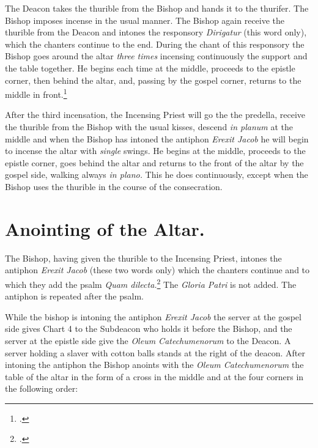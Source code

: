 \documentclass[letterpaper]{report}
\begin{document}
{\rubric The Deacon takes the thurible from the Bishop and hands it to the
thurifer. The Bishop imposes incense in the usual manner. The Bishop again
receive the thurible from the Deacon and intones the responsory
\textit{Dirigatur} (this word only), which the chanters continue to the end.
During the chant of this responsory the Bishop goes around the altar
\textit{three times} incensing continuously the support and the table together.
He begins each time at the middle, proceeds to the epistle corner, then behind
the altar, and, passing by the gospel corner, returns to the middle in
front.\footcite[If the back of the altar is attached to the wall, he begins at
the middle, incenses the support as fas as the epistle corner, afterwards the
table from the epistle to the gospel side, then the side of the altar at the
gospel side, then the side of the altar at the gospel corner and finally the
support from the gospel corner to the middle.][footnote 1, p. 96.]{consecranda}

\rubric After the third incensation, the Incensing Priest will go the the
predella, receive the thurible from the Bishop with the usual kisses, descend
\textit{in planum} at the middle and when the Bishop has intoned the antiphon
\textit{Erexit Jacob} he will begin to incense the altar with \textit{single}
swings. He begins at the middle, proceeds to the epistle corner, goes behind
the altar and returns to the front of the altar by the gospel side, walking
always \textit{in plano.} This he does continuously, except when the Bishop
uses the thurible in the course of the consecration.

\section{Anointing of the Altar.}

\rubric The Bishop, having given the thurible to the Incensing Priest, intones
the antiphon \textit{Erexit Jacob} (these two words only) which the chanters
continue and to which they add the psalm \textit{Quam dilecta.}\footcite[The
rubric appplied to psalm 42 above applied here as well.]{consecranda} The
\textit{Gloria Patri} is not added. The antiphon is repeated after the psalm.

\rubric While the bishop is intoning the antiphon \textit{Erexit Jacob} the
server at the gospel side gives Chart 4 to the Subdeacon who holds it before
the Bishop, and the server at the epistle side give the \textit{Oleum
Catechumenorum} to the Deacon. A server holding a slaver with cotton balls
stands at the right of the deacon. After intoning the antiphon the Bishop
anoints with the \textit{Oleum Catechumenorum} the table of the altar in the
form of a cross in the middle and at the four corners in the following order:

}
\end{document}
